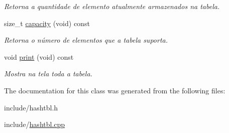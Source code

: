 \begin{DoxyCompactItemize}
\begin{DoxyCompactList}\small\item\em Retorna a quantidade de elemento atualmente armazenados na tabela. \end{DoxyCompactList}\item 
size\+\_\+t \hyperlink{classMyHashTable_1_1HashTbl_af8c52791e73b8115d90b8d0ad9e71a10}{capacity} (void) const \hypertarget{classMyHashTable_1_1HashTbl_af8c52791e73b8115d90b8d0ad9e71a10}{}\label{classMyHashTable_1_1HashTbl_af8c52791e73b8115d90b8d0ad9e71a10}

\begin{DoxyCompactList}\small\item\em Retorna o número de elementos que a tabela suporta. \end{DoxyCompactList}\item 
void \hyperlink{classMyHashTable_1_1HashTbl_a74ac810a0614d7e61e65ac725ed0b3f9}{print} (void) const \hypertarget{classMyHashTable_1_1HashTbl_a74ac810a0614d7e61e65ac725ed0b3f9}{}\label{classMyHashTable_1_1HashTbl_a74ac810a0614d7e61e65ac725ed0b3f9}

\begin{DoxyCompactList}\small\item\em Mostra na tela toda a tabela. \end{DoxyCompactList}\end{DoxyCompactItemize}


The documentation for this class was generated from the following files\+:\begin{DoxyCompactItemize}
\item 
include/hashtbl.\+h\item 
include/\hyperlink{hashtbl_8cpp}{hashtbl.\+cpp}\end{DoxyCompactItemize}
